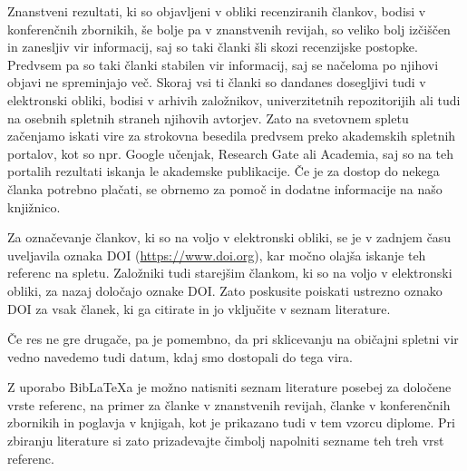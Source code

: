 Znanstveni rezultati, ki so objavljeni v obliki recenziranih člankov, bodisi v konferenčnih
zbornikih, še bolje pa v znanstvenih revijah, so veliko bolj izčiščen in zanesljiv vir informacij,
saj so taki članki šli skozi recenzijske postopke.
Predvsem pa so taki članki stabilen vir informacij, saj se načeloma po njihovi objavi ne spreminjajo več.
Skoraj vsi ti članki so dandanes dosegljivi tudi v elektronski obliki, bodisi v arhivih založnikov,
univerzitetnih repozitorijih ali tudi na osebnih spletnih straneh njihovih avtorjev.
Zato na svetovnem spletu začenjamo iskati vire za strokovna besedila predvsem preko akademskih
spletnih portalov, kot so npr. Google učenjak, Research Gate ali Academia, saj so na teh portalih
rezultati iskanja le akademske publikacije.
Če je za dostop do nekega članka potrebno plačati, se obrnemo za pomoč in dodatne informacije na našo knjižnico.

Za označevanje člankov, ki so na voljo v elektronski obliki, se je v zadnjem času uveljavila oznaka DOI
(\url{https://www.doi.org}), kar močno olajša iskanje teh referenc na spletu.
Založniki tudi starejšim člankom, ki so na voljo v elektronski obliki, za nazaj določajo oznake DOI.
Zato poskusite poiskati ustrezno oznako DOI za vsak članek, ki ga citirate in jo vključite v seznam literature.

Če res ne gre drugače, pa je pomembno, da pri sklicevanju na običajni spletni vir vedno navedemo
tudi datum, kdaj smo dostopali do tega vira.

Z uporabo BibLaTeXa je možno natisniti seznam literature posebej za določene vrste referenc,
na primer za članke v znanstvenih revijah, članke v konferenčnih zbornikih in poglavja v knjigah,
kot je prikazano tudi v tem vzorcu diplome.
Pri zbiranju literature si zato prizadevajte čimbolj napolniti sezname teh treh vrst referenc.

